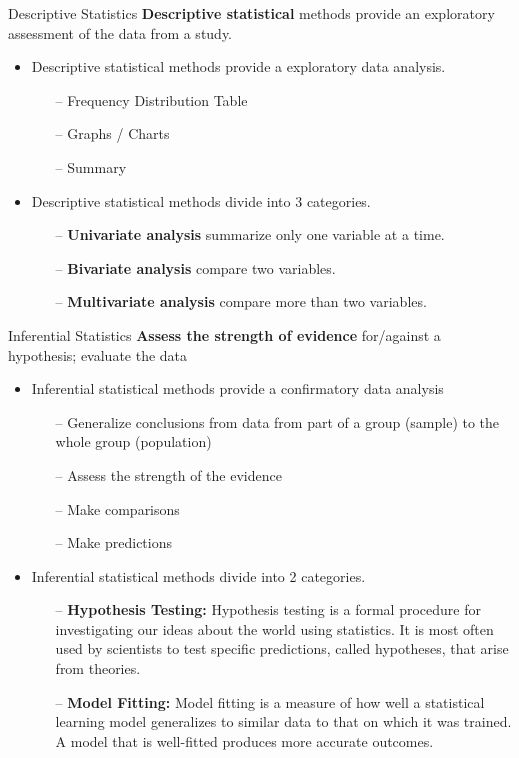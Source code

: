 \begin{frame}[t]{Descriptive Statistics}
	\textbf{Descriptive statistical} methods provide an exploratory assessment 
	of the data from a study. 
	\begin{itemize}
		\item Descriptive statistical methods provide a exploratory data 
		analysis.
		\begin{itemize}
			\item[--] Frequency Distribution Table 
			\item[--] Graphs / Charts 
			\item [--] Summary 
		\end{itemize}
		\item Descriptive statistical methods divide into 3 categories.
		\begin{itemize}
			\item[--] \textbf{Univariate analysis} summarize only one variable 
			at a 
			time.
			\item[--] \textbf{Bivariate analysis}  compare two variables.
			\item [--]\textbf{Multivariate analysis} compare more than two 
			variables.
		\end{itemize}
	\end{itemize}
\end{frame}

\begin{frame}[t]{Inferential Statistics}
	\textbf{Assess the strength of evidence} for/against a hypothesis; evaluate 
	the data
	\begin{itemize}
		\item Inferential statistical methods provide a confirmatory data 
		analysis
		\begin{itemize}
			\item [--]Generalize conclusions from data from part of a group 
			(sample) to the whole group
			(population)
			\item[--] Assess the strength of the evidence
			\item [--]Make comparisons
			\item [--]Make predictions
		\end{itemize}
	\item Inferential statistical methods divide into 2 categories.
	\begin{itemize}
		\item[--] \textbf{ Hypothesis Testing:} Hypothesis testing is a formal 
		procedure for investigating our ideas about the world using statistics. 
		It is most often used by scientists to test specific predictions, 
		called hypotheses, that arise from theories.
		\item[--] \textbf{Model Fitting:} Model fitting is a measure of how 
		well a statistical learning model generalizes to similar data to that 
		on which it was trained. A model that is well-fitted produces more 
		accurate outcomes.
	\end{itemize}
	\end{itemize}
\end{frame}


